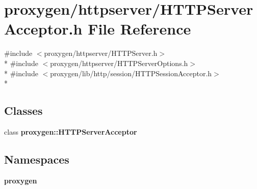 \section{proxygen/httpserver/\+H\+T\+T\+P\+Server\+Acceptor.h File Reference}
\label{HTTPServerAcceptor_8h}
{\ttfamily \#include $<$proxygen/httpserver/\+H\+T\+T\+P\+Server.\+h$>$}\\*
{\ttfamily \#include $<$proxygen/httpserver/\+H\+T\+T\+P\+Server\+Options.\+h$>$}\\*
{\ttfamily \#include $<$proxygen/lib/http/session/\+H\+T\+T\+P\+Session\+Acceptor.\+h$>$}\\*
\subsection*{Classes}
\begin{DoxyCompactItemize}
\item 
class {\bf proxygen\+::\+H\+T\+T\+P\+Server\+Acceptor}
\end{DoxyCompactItemize}
\subsection*{Namespaces}
\begin{DoxyCompactItemize}
\item 
 {\bf proxygen}
\end{DoxyCompactItemize}
